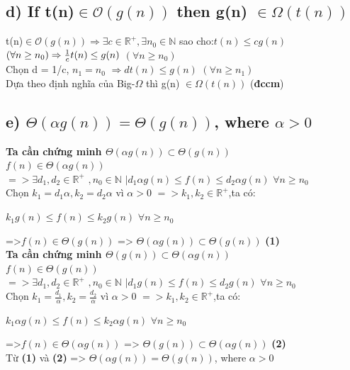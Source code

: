 \documentclass[10pt,a4paper]{article}
\begin{document}
\subsection*{d)
If t(n)$\in \mathcal{O}(g(n))$ then g(n) $\in \Omega(t(n))$ }
t(n)$\in \mathcal{O}(g(n)) \Rightarrow \exists c \in \mathbb{R^+},\exists n_0 \in \mathbb{N}$ sao cho:$ t(n) \leq cg(n)$ $(\forall n \geq n_0) \\
\Rightarrow \frac{1}{c}t(n) \leq g(n)$ $(\forall n \geq n_0)$\\
Chọn d = 1/c, $n_1=n_0$ $\Rightarrow dt(n) \leq g(n)$ $(\forall n \geq n_1)$\\
Dựa theo định nghĩa của Big-$\Omega$ thì 
g(n) $\in \Omega(t(n))$ (\textbf{đccm})
\subsection*{e) $\Theta(\alpha g(n)) = \Theta(g(n))$, where $\alpha > 0$}
\textbf{Ta cần chứng minh $\Theta(\alpha g(n)) \subset \Theta(g(n))$} \\
 $f(n) \in \Theta(\alpha g(n))$ \\
$=> \exists d_1,d_2 \in \mathbb{R^+}$ $,n_0 \in \mathbb{N}$ $ | d_1\alpha g(n) \leq f(n) \leq d_2\alpha g(n)$ $ \forall n \geq n_0$ \\
Chọn $k_1= d_1\alpha, k_2=d_2\alpha$ vì $\alpha > 0$ $=> k_1,k_2 \in \mathbb{R^+}$,ta có:\\
\centerline{$k_1g(n) \leq f(n) \leq k_2g(n)$ $\forall n \geq n_0$}
=>$f(n) \in \Theta(g(n))$ => $\Theta(\alpha g(n)) \subset \Theta(g(n))$ \textbf{(1)}\\

\textbf{Ta cần chứng minh $\Theta(g(n)) \subset \Theta(\alpha g(n))$} \\
 $f(n) \in \Theta(g(n))$ \\
$=> \exists d_1,d_2 \in \mathbb{R^+}$ $,n_0 \in \mathbb{N}$ $ | d_1 g(n) \leq f(n) \leq d_2 g(n)$ $ \forall n \geq n_0$ \\
Chọn $k_1= \frac{d_1}{\alpha}, k_2=\frac{d_2}{\alpha}$ vì $\alpha > 0$ $=> k_1,k_2 \in \mathbb{R^+}$,ta có:\\
\centerline{$k_1\alpha g(n) \leq f(n) \leq k_2\alpha g(n)$ $\forall n \geq n_0$}
=>$f(n) \in \Theta(\alpha g(n))$ => $\Theta(g(n)) \subset \Theta(\alpha g(n))$ \textbf{(2)}\\
Từ \textbf{(1)} và \textbf{(2)} => $\Theta(\alpha g(n)) = \Theta(g(n))$, where $\alpha > 0$\\
\end{document}
